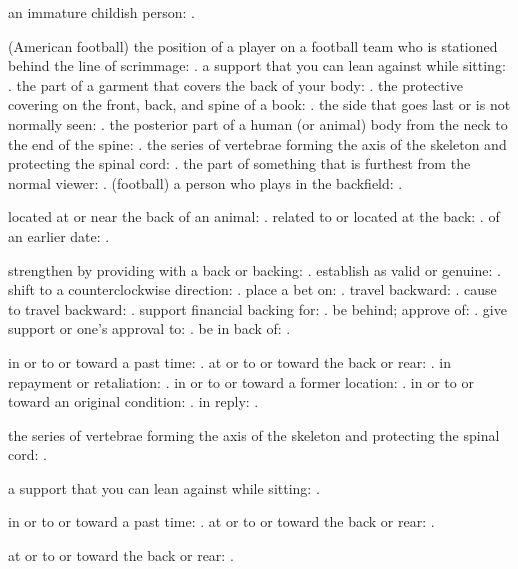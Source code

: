   an immature childish person: .

  (American football) the position of a player on a football team who is stationed behind the line of scrimmage: . a support that you can lean against while sitting: . the part of a garment that covers the back of your body: . the protective covering on the front, back, and spine of a book: . the side that goes last or is not normally seen: . the posterior part of a human (or animal) body from the neck to the end of the spine: . the series of vertebrae forming the axis of the skeleton and protecting the spinal cord: . the part of something that is furthest from the normal viewer: . (football) a person who plays in the backfield: .

  located at or near the back of an animal: . related to or located at the back: . of an earlier date: .

  strengthen by providing with a back or backing: . establish as valid or genuine: . shift to a counterclockwise direction: . place a bet on: . travel backward: . cause to travel backward: . support financial backing for: . be behind; approve of: . give support or one's approval to: . be in back of: .

  in or to or toward a past time: . at or to or toward the back or rear: . in repayment or retaliation: . in or to or toward a former location: . in or to or toward an original condition: . in reply: .

  the series of vertebrae forming the axis of the skeleton and protecting the spinal cord: .

  a support that you can lean against while sitting: .

  in or to or toward a past time: . at or to or toward the back or rear: .

  at or to or toward the back or rear: .


